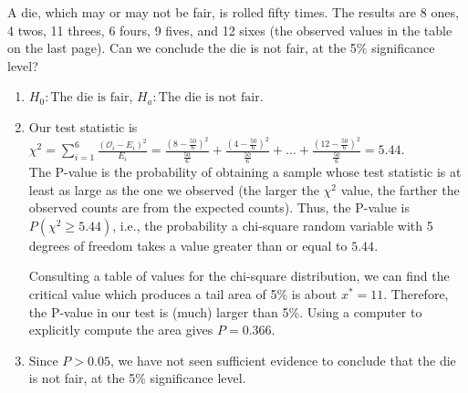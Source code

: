 \begin{example}
A die, which may or may not be fair, is rolled fifty times. The results are 8 ones, 4 twos, 11 threes, 6 fours, 9 fives, and 12 sixes (the observed values in the table on the last page). Can we conclude the die is not fair, at the 5\% significance level?

\begin{enumerate}[label=\textnormal{\Roman*}.]
\item $H_0: \text{The die is fair}$, $H_a: \text{The die is not fair}$.

\item Our test statistic is $\chi^2 = \sum_{i=1}^6 \frac{(\mathcal{O}_i - E_i)^2}{E_i} = \frac{(8-\frac{50}{6})^2}{\frac{50}{6}} + \frac{(4-\frac{50}{6})^2}{\frac{50}{6}} + \dots + \frac{(12-\frac{50}{6})^2}{\frac{50}{6}} = 5.44.$ \\

The P-value is the probability of obtaining a sample whose test statistic is at least as large as the one we observed (the larger the $\chi^2$ value, the farther the observed counts are from the expected counts). Thus, the P-value is $P(\chi^2 \geq 5.44)$, i.e., the probability a chi-square random variable with 5 degrees of freedom takes a value greater than or equal to $5.44$.
\begin{center}
\end{center}
Consulting a table of values for the chi-square distribution, we can find the critical value which produces a tail area of 5\% is about $x^* = 11$. Therefore, the P-value in our test is (much) larger than 5\%. Using a computer to explicitly compute the area gives $P = 0.366$.

\item Since $P > 0.05$, we have not seen sufficient evidence to conclude that the die is not fair, at the 5\% significance level.
\end{enumerate}
\end{example}

